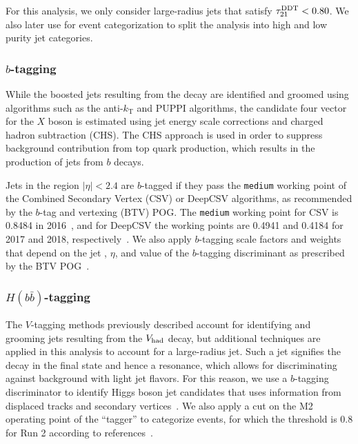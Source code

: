 For this analysis, we only consider large-radius jets that satisfy $\tau_{21}^\mathrm{DDT}<0.80$.
We also later use \nsubjDDT for event categorization to split the analysis into high and low purity jet categories.

\subsubsection{$b$-tagging}

While the boosted jets resulting from the \Vhad decay are identified and groomed using algorithms such as the anti-$k_\mathrm{T}$ and PUPPI algorithms, the candidate four vector for the $X$ boson is estimated using jet energy scale corrections and charged hadron subtraction (CHS).
The CHS approach is used in order to suppress background contribution from top quark production, which results in the production of jets from $b$ decays.

Jets in the region $|\eta|<2.4$ are $b$-tagged if they pass the \texttt{medium} working point of the Combined Secondary Vertex (CSV) or DeepCSV algorithms, as recommended by the $b$-tag and vertexing (BTV) POG.
The \texttt{medium} working point for CSV is 0.8484 in 2016~\cite{bTagging2016}, and for DeepCSV the working points are 0.4941 and 0.4184 for 2017 and 2018, respectively~\cite{bTagging2017,bTagging2018}.
We also apply $b$-tagging scale factors and weights that depend on the jet \pt, $\eta$, and value of the $b$-tagging discriminant as prescribed by the BTV POG~\cite{bTaggingEff,bTaggingSF}.

\subsubsection{$H(b\bar{b})$-tagging}

The $V$-tagging methods previously described account for identifying and grooming jets resulting from the $V_\mathrm{had}$ decay, but additional techniques are applied in this analysis to account for a large-radius \bbbar jet.
Such a jet signifies the decay \Htobbbar in the final state and hence a \WH resonance, which allows for discriminating against background with light jet flavors.
For this reason, we use a $b$-tagging discriminator to identify Higgs boson jet candidates that uses information from displaced tracks and secondary vertices~\cite{CMS-PAS-BTV-15-002}.
We also apply a cut on the M2 operating point of the ``\DoubleB tagger'' to categorize events, for which the threshold is 0.8 for Run 2 according to references~\cite{bTagging2016,bTagging2017,bTagging2018}.

